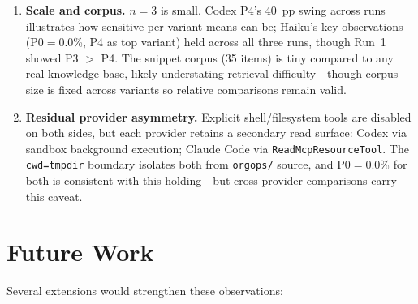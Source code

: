 \documentclass[10pt,a4paper,twocolumn]{article}
\begin{document}
\begin{enumerate}
    \item \textbf{Scale and corpus.} $n{=}3$ is small. Codex P4's 40~pp
    swing across runs illustrates how sensitive per-variant means can be;
    Haiku's key observations (P0$=$0.0\%, P4 as top variant) held across
    all three runs, though Run~1 showed P3 $>$ P4. The snippet corpus
    (35 items) is tiny compared to any real knowledge base, likely
    understating retrieval difficulty---though corpus size is fixed across
    variants so relative comparisons remain valid.

    \item \textbf{Residual provider asymmetry.}
    \label{sec:lim-asymmetry}
    Explicit shell/filesystem tools are disabled on both sides, but each
    provider retains a secondary read surface: Codex via sandbox
    background execution; Claude Code via \texttt{ReadMcpResourceTool}.
    The \texttt{cwd=tmpdir} boundary isolates both from \texttt{orgops/}
    source, and P0$=$0.0\% for both is consistent with this
    holding---but cross-provider comparisons carry this caveat.
\end{enumerate}

\section{Future Work}
\label{sec:future-work}

Several extensions would strengthen these observations:
\end{document}
